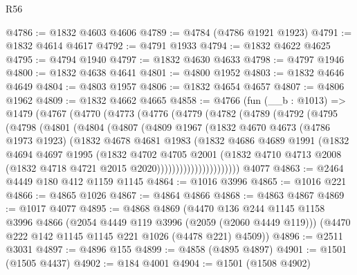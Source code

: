 \begin{lexlean}{R56}
\begin{coremodule}
@4786 := @1832 @4603 @4606
@4789 := @4784 (@4786 @1921 @1923)
@4791 := @1832 @4614 @4617
@4792 := @4791 @1933
@4794 := @1832 @4622 @4625
@4795 := @4794 @1940
@4797 := @1832 @4630 @4633
@4798 := @4797 @1946
@4800 := @1832 @4638 @4641
@4801 := @4800 @1952
@4803 := @1832 @4646 @4649
@4804 := @4803 @1957
@4806 := @1832 @4654 @4657
@4807 := @4806 @1962
@4809 := @1832 @4662 @4665
@4858 := @4766
    (fun (__b : @1013) =>
    @1479
      (@4767
        (@4770
          (@4773
            (@4776
              (@4779
                (@4782
                  (@4789
                    (@4792
                      (@4795
                        (@4798
                          (@4801
                            (@4804
                              (@4807
                                (@4809
                                  @1967
                                  (@1832
                                    @4670
                                    @4673
                                    (@4786 @1973 @1923)
                                    (@1832
                                      @4678
                                      @4681
                                      @1983
                                      (@1832
                                        @4686
                                        @4689
                                        @1991
                                        (@1832
                                          @4694
                                          @4697
                                          @1995
                                          (@1832
                                            @4702
                                            @4705
                                            @2001
                                            (@1832
                                              @4710
                                              @4713
                                              @2008
                                              (@1832 @4718 @4721 @2015 @2020))))))))))))))))))))))
    @4077
@4863 := @2464 @4449 @180 @412 @1159 @1145
@4864 := @1016 @3996
@4865 := @1016 @221
@4866 := @4865 @1026
@4867 := @4864 @4866
@4868 := @4863 @4867
@4869 := @1017 @4077
@4895 := @4868
    @4869
    (@4470
      @136
      @244
      @1145
      @1158
      @3996
      @4866
      (@2054 @4449 @119 @3996 (@2059 (@2060 @4449 @119)))
      (@4470 @222 @142 @1145 @1145 @221 @1026 (@4478 @221) @4509))
@4896 := @2511 @3031
@4897 := @4896 @155
@4899 := @4858 (@4895 @4897)
@4901 := @1501 (@1505 @4437)
@4902 := @184 @4001
@4904 := @1501 (@1508 @4902)

\end{coremodule}
\end{lexlean}
